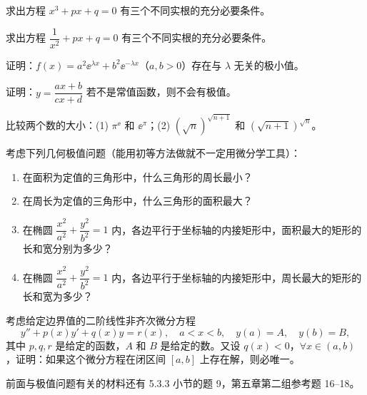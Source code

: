 \begin{xexercise}[2]
求出方程 $x^3+px+q=0$ 有三个不同实根的充分必要条件。
\end{xexercise}

\begin{xexercise}[3]
求出方程 $\dfrac1{x^2}+px+q=0$ 有三个不同实根的充分必要条件。
\end{xexercise}

\begin{xexercise}[4]
证明：$f(x)=a^2\ee^{\lambda x}+b^2\ee^{-\lambda x}$（$a,b>0$）存在与 $\lambda$ 无关的极小值。
\end{xexercise}

\begin{xexercise}[5]
证明：$y=\dfrac{ax+b}{cx+d}$ 若不是常值函数，则不会有极值。
\end{xexercise}

\begin{xexercise}[6]
比较两个数的大小：(1) $\pi^{\ee}$ 和 $\ee^\pi$；(2) $(\sqrt n)^{\sqrt{n+1}}$ 和 $(\sqrt{n+1})^{\sqrt n}$。
\end{xexercise}

\begin{xexercise}[7]
考虑下列几何极值问题（能用初等方法做就不一定用微分学工具）：
  \begin{enumerate}[label=(\arabic*)]
    \item 在面积为定值的三角形中，什么三角形的周长最小？
    \item 在周长为定值的三角形中，什么三角形的面积最大？
    \item 在椭圆 $\dfrac{x^2}{a^2}+\dfrac{y^2}{b^2}=1$ 内，各边平行于坐标轴的内接矩形中，面积最大的矩形的长和宽分别为多少？
    \item 在椭圆 $\dfrac{x^2}{a^2}+\dfrac{y^2}{b^2}=1$ 内，各边平行于坐标轴的内接矩形中，周长最大的矩形的长和宽为多少？
  \end{enumerate}
\end{xexercise}

\begin{xexercise}[8]
考虑给定边界值的二阶线性非齐次微分方程
  \[
    y''+p(x)y'+q(x)y=r(x),\quad a<x<b,\quad y(a)=A,\quad y(b)=B,
  \]
  其中 $p,q,r$ 是给定的函数，$A$ 和 $B$ 是给定的数。又设 $q(x)<0$，$\forall x\in(a,b)$，证明：如果这个微分方程在闭区间 $[a,b]$ 上存在解，则必唯一。
\end{xexercise}

\begin{xremark}
前面与极值问题有关的材料还有 5.3.3 小节的题 9，第五章第二组参考题 16--18。
\end{xremark}

